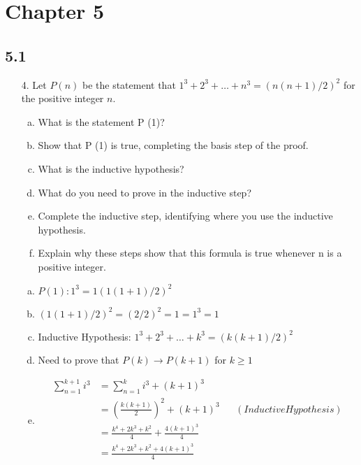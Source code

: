 \section{Chapter 5}
\subsection{5.1}
\begin{itemize}
    \item [4.] Let $P(n)$ be the statement that $1^3 + 2^3 +\ldots + n^3 = (n(n + 1)/2)^2$ for the positive integer $n$.
          \begin{enumerate}[a.]
              \item What is the statement P (1)?
              \item Show that P (1) is true, completing the basis step of the proof.
              \item What is the inductive hypothesis?
              \item What do you need to prove in the inductive step?
              \item Complete the inductive step, identifying where you use the inductive hypothesis.
              \item Explain why these steps show that this formula is true whenever n is a positive integer.
          \end{enumerate}
          \answer
          \begin{enumerate}[a.]
              \item $P(1):1^3 = 1(1(1+1)/2)^2$
              \item $(1(1+1)/2)^2 = (2/2)^2 = 1 = 1^3 = 1$
              \item Inductive Hypothesis: $ 1^3 + 2^3 + \ldots + k^3 = (k(k+1)/2)^2$
              \item Need to prove that $P(k) \to P(k+1)$ for $k \geq 1$
              \item
                    \begin{align*}
                        \sum_{n=1}^{k+1} i^3 & = \sum_{n=1}^{k} i^3 + (k+1)^3                                                    \\
                                             & = \left(\frac{k(k+1)}{2}\right)^2 + (k+1)^3           &  & (Inductive Hypothesis) \\
                                             & =\frac{k^4 + 2k^3 + k^2}{4}+ \frac{4(k+1)^3}{4}                                   \\
                                             & = \frac{k^4 + 2k^3 + k^2 + 4(k+1)^3}{4}                                           \\

\end{align*}
\end{enumerate}
\end{itemize}
